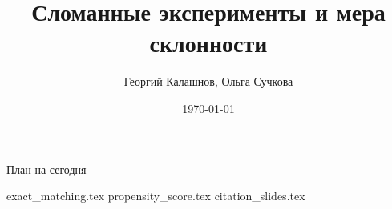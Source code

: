 \title{Сломанные эксперименты и мера склонности}
\author[Георгий Калашнов, Ольга Сучкова]{Георгий Калашнов, Ольга Сучкова}
\date{\today}



\begin{frame}
  \titlepage
  
\end{frame}


\begin{frame}{План на сегодня} 
\tableofcontents
\end{frame}

{exact_matching.tex}
{propensity_score.tex}
{citation_slides.tex}






